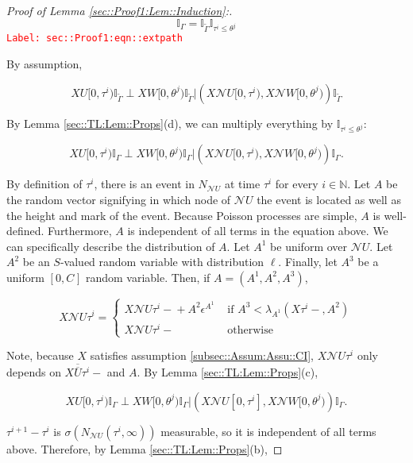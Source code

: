 \documentclass[12pt]{article}
\newcommand{\mb}{\mathbb}
\newcommand{\mc}{\mathcal}
\newcommand{\ov}{\overline}
\newcommand{\te}{\text}
\newcommand{\ep}{\epsilon}
\newcommand{\tr}{\textcolor{red}}
\newcommand{\labe}[1]{\tr{\texttt{Label: #1}}}
\renewcommand{\U}{U}							%
\newcommand{\UU}{W}								%
\renewcommand{\S}{S}							%
\newcommand{\ev}[1]{\ep^{#1}}					%
\newcommand{\X}{X}								%
\newcommand{\neigh}{\mc{N}}						%
\newcommand{\cl}{\ov}							%
\newcommand{\poiss}[1]{N_{#1}}						%
\newcommand{\rt}[1]{\tau^{#1}}						%
\newcommand{\rtt}[1]{\theta^{#1}}					%
\newcommand{\itt}{i}								%
\newcommand{\ittt}{j}								%
\newcommand{\rate}[1]{\lambda_{#1}}					%
\newcommand{\const}[1]{C_{#1}}						%
\newcommand{\Sm}{\ell}								%
\newcommand{\alt}{\widetilde}						%
\newcommand{\apath}{\Gamma}						%
\newcommand{\rv}{A}								%
\begin{document}
\begin{proof}[Proof of Lemma \ref{sec::Proof1:Lem::Induction}:]
\begin{equation}
\mb{I}_{\apath} = \mb{I}_{\alt{\apath}}\mb{I}_{\rt{\itt} \leq \rtt{\ittt}}
\label{sec::Proof1:eqn::extpath}
\end{equation}
\labe{sec::Proof1:eqn::extpath}

By assumption,

\[\X{\U}{[0,\rt{\itt})}\mb{I}_{\alt{\apath}}\perp \X{\UU}{[0,\rtt{\ittt})}\mb{I}_{\alt{\apath}}|\left(\X{\neigh{\U}}{[0,\rt{\itt})},\X{\neigh{\UU}}{[0,\rtt{\ittt})}\right)\mb{I}_{\alt{\apath}}\]

By Lemma \ref{sec::TL:Lem::Props}(d), we can multiply everything by \(\mb{I}_{\rt{\itt} \leq \rtt{\ittt}}\):

\[\X{\U}{[0,\rt{\itt})}\mb{I}_{\apath}\perp \X{\UU}{[0,\rtt{\ittt})}\mb{I}_{\apath}|\left(\X{\neigh{\U}}{[0,\rt{\itt})},\X{\neigh{\UU}}{[0,\rtt{\ittt})}\right)\mb{I}_{\apath}.\]

By definition of \(\rt{\itt}\), there is an event in \(\poiss{\neigh{\U}}\) at time \(\rt{\itt}\) for every \(\itt \in \mb{ N}\). Let \(\rv\) be the random vector signifying in which node of \(\neigh{\U}\) the event is located as well as the height and mark of the event. Because Poisson processes are simple, \(\rv\) is well-defined. Furthermore, \(\rv\) is independent of all terms in the equation above. We can specifically describe the distribution of \(\rv\). Let \(\rv^1\) be uniform over \(\neigh{\U}\). Let \(\rv^2\) be an \(\S\)-valued random variable with distribution \(\Sm\). Finally, let \(\rv^3\) be a uniform \([0,\const{}]\) random variable. Then, if \(\rv=(\rv^1,\rv^2,\rv^3)\),

\[\X{\neigh{\U}}{\rt{\itt}} = \begin{cases}
\X{\neigh{\U}}{\rt{\itt}-} + \rv^2\ev{\rv^1} &\te{ if } \rv^3< \rate{\rv^1}(\X{}{\rt{\itt}-}, \rv^2)\\
\X{\neigh{\U}}{\rt{\itt}-} &\te{ otherwise}
\end{cases}\]

Note, because \(\X{}{}\) satisfies assumption \ref{subsec::Assum:Assu::CI}, \(\X{\neigh{\U}}{\rt{\itt}}\) only depends on \(\X{\cl{\cl{\U}}}{\rt{\itt}-}\) and \(\rv\). By Lemma \ref{sec::TL:Lem::Props}(c), 

\[\X{\U}{[0,\rt{\itt})}\mb{I}_{\apath}\perp \X{\UU}{[0,\rtt{\ittt})}\mb{I}_{\apath}|\left(\X{\neigh{\U}}{[0,\rt{\itt}]},\X{\neigh{\UU}}{[0,\rtt{\ittt})}\right)\mb{I}_{\apath}.\]

\(\rt{\itt+1} - \rt{\itt}\) is \(\sigma(\poiss{\neigh{\U}}(\rt{\itt},\infty))\) measurable, so it is independent of all terms above. Therefore, by Lemma \ref{sec::TL:Lem::Props}(b),


\end{proof}
\end{document}
